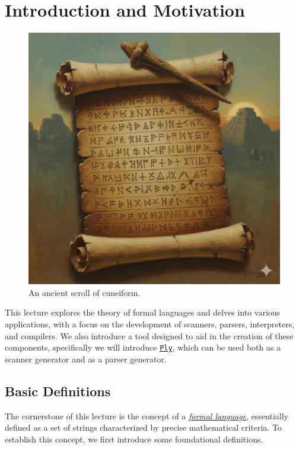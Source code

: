 \chapter{Introduction and Motivation}

\begin{figure}[h] 
\centering
  \includegraphics[width=12.5cm]{Abbildungen/cuneiform.png}
\caption{An ancient scroll of cuneiform.}
\label{fig:cuneiform.png}
\end{figure}


This lecture explores the theory of formal languages and delves into various applications, with a focus on the
development of scanners, parsers, interpreters, and compilers. We also introduce a tool designed to aid in the
creation of these components, specifically we will introduce
\href{https://www.dabeaz.com/ply/ply.html}{\texttt{Ply}}, which can be used both as a scanner generator and as
a parser generator. 

\section{Basic Definitions}
The cornerstone of this lecture is the concept of a \href{http://en.wikipedia.org/wiki/Formal_language}{\emph{formal language}},  essentially defined as a set of strings characterized by precise mathematical criteria. To establish this concept, we first introduce some foundational definitions.

